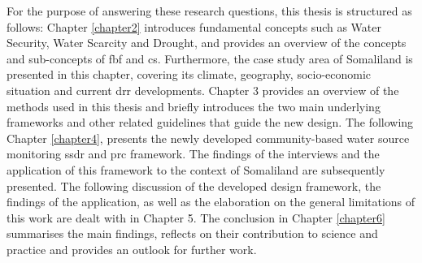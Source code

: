 \noindent For the purpose of answering these research questions, this thesis is structured as follows: Chapter \ref{chapter2} introduces fundamental concepts such as Water Security, Water Scarcity and Drought, and provides an overview of the concepts and sub-concepts of \acrshort{fbf} and \acrshort{cs}. Furthermore, the case study area of Somaliland is presented in this chapter, covering its climate, geography, socio-economic situation and current \acrlong{drr} developments. Chapter 3 provides an overview of the methods used in this thesis and briefly introduces the two main underlying frameworks and other related guidelines that guide the new design. The following Chapter \ref{chapter4}, presents the newly developed community-based water source monitoring \acrfull{ssdr} and \acrfull{prc} framework. The findings of the interviews and the application of this framework to the context of Somaliland are subsequently presented. The following discussion of the developed design framework, the findings of the application, as well as the elaboration on the general limitations of this work are dealt with in Chapter 5. The conclusion in Chapter \ref{chapter6} summarises the main findings, reflects on their contribution to science and practice and provides an outlook for further work.
